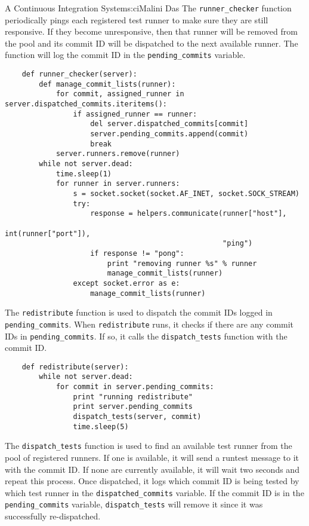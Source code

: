 \begin{aosachapter}{A Continuous Integration System}{s:ci}{Malini Das}
The \texttt{runner\_checker} function periodically pings each registered
test runner to make sure they are still responsive. If they become
unresponsive, then that runner will be removed from the pool and its
commit ID will be dispatched to the next available runner. The function
will log the commit ID in the \texttt{pending\_commits} variable.

\begin{verbatim}
    def runner_checker(server):
        def manage_commit_lists(runner):
            for commit, assigned_runner in server.dispatched_commits.iteritems():
                if assigned_runner == runner:
                    del server.dispatched_commits[commit]
                    server.pending_commits.append(commit)
                    break
            server.runners.remove(runner)
        while not server.dead:
            time.sleep(1)
            for runner in server.runners:
                s = socket.socket(socket.AF_INET, socket.SOCK_STREAM)
                try:
                    response = helpers.communicate(runner["host"],
                                                   int(runner["port"]),
                                                   "ping")
                    if response != "pong":
                        print "removing runner %s" % runner
                        manage_commit_lists(runner)
                except socket.error as e:
                    manage_commit_lists(runner)
\end{verbatim}

The \texttt{redistribute} function is used to dispatch the commit IDs
logged in \texttt{pending\_commits}. When \texttt{redistribute} runs, it
checks if there are any commit IDs in \texttt{pending\_commits}. If so,
it calls the \texttt{dispatch\_tests} function with the commit ID.

\begin{verbatim}
    def redistribute(server):
        while not server.dead:
            for commit in server.pending_commits:
                print "running redistribute"
                print server.pending_commits
                dispatch_tests(server, commit)
                time.sleep(5)
\end{verbatim}

The \texttt{dispatch\_tests} function is used to find an available test
runner from the pool of registered runners. If one is available, it will
send a runtest message to it with the commit ID. If none are currently
available, it will wait two seconds and repeat this process. Once
dispatched, it logs which commit ID is being tested by which test runner
in the \texttt{dispatched\_commits} variable. If the commit ID is in the
\texttt{pending\_commits} variable, \texttt{dispatch\_tests} will remove
it since it was successfully re-dispatched.


\end{aosachapter}
